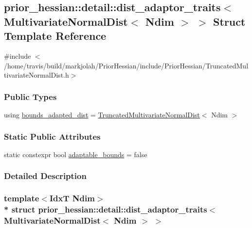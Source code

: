 \hypertarget{structprior__hessian_1_1detail_1_1dist__adaptor__traits_3_01MultivariateNormalDist_3_01Ndim_01_4_01_4}{}\subsection{prior\+\_\+hessian\+:\+:detail\+:\+:dist\+\_\+adaptor\+\_\+traits$<$ Multivariate\+Normal\+Dist$<$ Ndim $>$ $>$ Struct Template Reference}
\label{structprior__hessian_1_1detail_1_1dist__adaptor__traits_3_01MultivariateNormalDist_3_01Ndim_01_4_01_4}


{\ttfamily \#include $<$/home/travis/build/markjolah/\+Prior\+Hessian/include/\+Prior\+Hessian/\+Truncated\+Multivariate\+Normal\+Dist.\+h$>$}

\subsubsection*{Public Types}
\begin{DoxyCompactItemize}
\item 
using \hyperlink{structprior__hessian_1_1detail_1_1dist__adaptor__traits_3_01MultivariateNormalDist_3_01Ndim_01_4_01_4_a08657a114ab62c2fe8d3004dc91d823b}{bounds\+\_\+adapted\+\_\+dist} = \hyperlink{namespaceprior__hessian_a99ef03c8a3e476931d451d6d944ffae5}{Truncated\+Multivariate\+Normal\+Dist}$<$ Ndim $>$
\end{DoxyCompactItemize}
\subsubsection*{Static Public Attributes}
\begin{DoxyCompactItemize}
\item 
static constexpr bool \hyperlink{structprior__hessian_1_1detail_1_1dist__adaptor__traits_3_01MultivariateNormalDist_3_01Ndim_01_4_01_4_a17273f68ee0cf8fb1f56166c08611948}{adaptable\+\_\+bounds} = false
\end{DoxyCompactItemize}


\subsubsection{Detailed Description}
\subsubsection*{template$<$IdxT Ndim$>$\\*
struct prior\+\_\+hessian\+::detail\+::dist\+\_\+adaptor\+\_\+traits$<$ Multivariate\+Normal\+Dist$<$ Ndim $>$ $>$}



